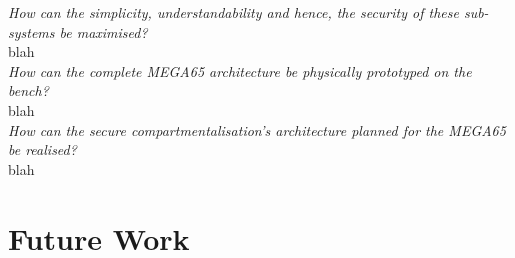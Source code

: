 \textit{How can the simplicity, understandability and hence, the security of these sub-systems be maximised?}\\
blah
\\
\textit{How can the complete MEGA65 architecture be physically prototyped on the bench?}\\
blah
\\
\textit{How can the secure compartmentalisation's architecture planned for the MEGA65 be realised?}\\
blah
\\



\section{Future Work}

